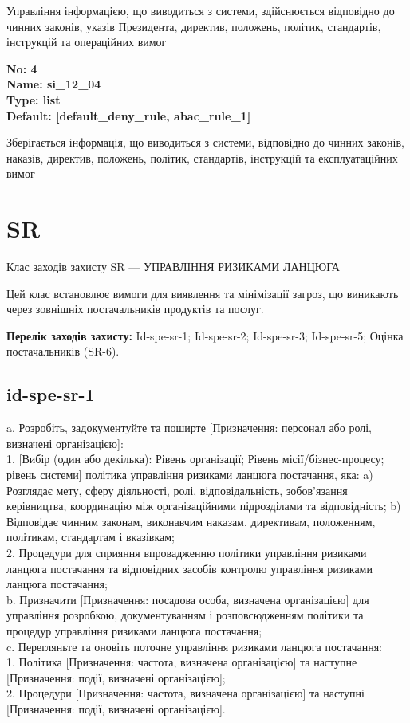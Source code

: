 \documentclass{article}
\begin{document}
{\footnotesize Управління інформацією, що виводиться з системи, здійснюється відповідно до чинних законів, указів Президента, директив, положень, політик, стандартів, інструкцій та операційних вимог}


{\footnotesize\bfseries
No: 4\\
Name: si\_\allowbreak{}12\_\allowbreak{}04\\
Type: list\\
Default: [\textquotedbl{}default\_\allowbreak{}deny\_\allowbreak{}rule\textquotedbl{}, \textquotedbl{}abac\_\allowbreak{}rule\_\allowbreak{}1\textquotedbl{}]
}

{\footnotesize Зберігається інформація, що виводиться з системи, відповідно до чинних законів, наказів, директив, положень, політик, стандартів, інструкцій та експлуатаційних вимог}




\section{SR}
Клас заходів захисту SR --- УПРАВЛІННЯ РИЗИКАМИ ЛАНЦЮГА

Цей клас встановлює вимоги для виявлення та мінімізації загроз, що виникають через зовнішніх постачальників продуктів та послуг.

\textbf{Перелік заходів захисту:} Id-spe-sr-1; Id-spe-sr-2; Id-spe-sr-3; Id-spe-sr-5; Оцінка постачальників (SR-6).

\subsection{id-spe-sr-1}
a. Розробіть, задокументуйте та поширте [Призначення: персонал або ролі, визначені організацією]:\\ 
1. [Вибір (один або декілька): Рівень організації; Рівень місії/бізнес-процесу; рівень системи] політика управління ризиками ланцюга постачання, яка: a) Розглядає мету, сферу діяльності, ролі, відповідальність, зобов'язання керівництва, координацію між організаційними підрозділами та відповідність; b) Відповідає чинним законам, виконавчим наказам, директивам, положенням, політикам, стандартам і вказівкам;\\ 
2. Процедури для сприяння впровадженню політики управління ризиками ланцюга постачання та відповідних засобів контролю управління ризиками ланцюга постачання;\\ 
b. Призначити [Призначення: посадова особа, визначена організацією] для управління розробкою, документуванням і розповсюдженням політики та процедур управління ризиками ланцюга постачання;\\ 
c. Перегляньте та оновіть поточне управління ризиками ланцюга постачання:\\ 
1. Політика [Призначення: частота, визначена організацією] та наступне [Призначення: події, визначені організацією];\\ 
2. Процедури [Призначення: частота, визначена організацією] та наступні [Призначення: події, визначені організацією].
\end{document}
